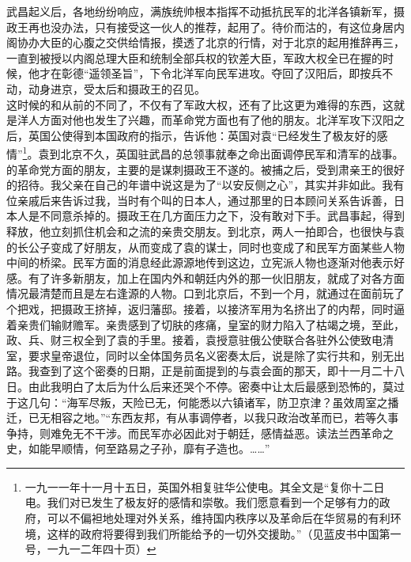 武昌起义后，各地纷纷响应，满族统帅根本指挥不动抵抗民军的北洋各镇新军，摄政王再也没办法，只有接受这一伙人的推荐，起用了。待价而沽的，有这位身居内阁协办大臣的心腹之交供给情报，摸透了北京的行情，对于北京的起用推辞再三，一直到被授以内阁总理大臣和统制全部兵权的钦差大臣，军政大权全已在握的时候，他才在彰德“遥领圣旨”，下令北洋军向民军进攻。夺回了汉阳后，即按兵不动，动身进京，受太后和摄政王的召见。\\

这时候的和从前的不同了，不仅有了军政大权，还有了比这更为难得的东西，这就是洋人方面对他也发生了兴趣，而革命党方面也有了他的朋友。北洋军攻下汉阳之后，英国公使得到本国政府的指示，告诉他：英国对袁“已经发生了极友好的感情”\footnote{一九一一年十一月十五日，英国外相复驻华公使电。其全文是“复你十二日电。我们对已发生了极友好的感情和崇敬。我们愿意看到一个足够有力的政府，可以不偏袒地处理对外关系，维持国内秩序以及革命后在华贸易的有利环境，这样的政府将要得到我们所能给予的一切外交援助。”（见蓝皮书中国第一号，一九一二年四十页）}。袁到北京不久，英国驻武昌的总领事就奉之命出面调停民军和清军的战事。的革命党方面的朋友，主要的是谋刺摄政王不遂的。被捕之后，受到肃亲王的很好的招待。我父亲在自己的年谱中说这是为了“以安反侧之心”，其实并非如此。我有位亲戚后来告诉过我，当时有个叫的日本人，通过那里的日本顾问关系告诉善，日本人是不同意杀掉的。摄政王在几方面压力之下，没有敢对下手。武昌事起，得到释放，他立刻抓住机会和之流的亲贵交朋友。到北京，两人一拍即合，也很快与袁的长公子变成了好朋友，从而变成了袁的谋士，同时也变成了和民军方面某些人物中间的桥梁。民军方面的消息经此源源地传到这边，立宪派人物也逐渐对他表示好感。有了许多新朋友，加上在国内外和朝廷内外的那一伙旧朋友，就成了对各方面情况最清楚而且是左右逢源的人物。口到北京后，不到一个月，就通过在面前玩了个把戏，把摄政王挤掉，返归藩邸。接着，以接济军用为名挤出了的内帮，同时逼着亲贵们输财赡军。亲贵感到了切肤的疼痛，皇室的财力陷入了枯竭之境，至此，政、兵、财三权全到了袁的手里。接着，袁授意驻俄公使联合各驻外公使致电清室，要求皇帝退位，同时以全体国务员名义密奏太后，说是除了实行共和，别无出路。我查到了这个密奏的日期，正是前面提到的与袁会面的那天，即十一月二十八日。由此我明白了太后为什么后来还哭个不停。密奏中让太后最感到恐怖的，莫过于这几句：“海军尽叛，天险已无，何能悉以六镇诸军，防卫京津？虽效周室之播迁，已无相容之地。”“东西友邦，有从事调停者，以我只政治改革而已，若等久事争持，则难免无不干涉。而民军亦必因此对于朝廷，感情益恶。读法兰西革命之史，如能早顺情，何至路易之子孙，靡有孑造也。……”\\

